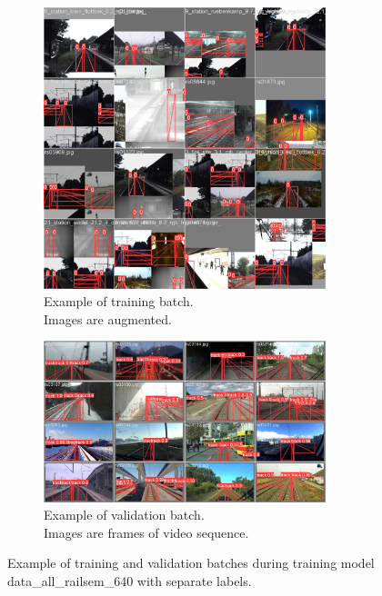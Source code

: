 \documentclass[Master,MDS,english]{BASE/twbook} %
\begin{document}
\begin{figure}[H]
\centering
\begin{subfigure}[t]{.5\textwidth}
  \centering
  \includegraphics[width=0.9\textwidth]{images/yolo/all_nl/train_batch2}
  \caption{Example of training batch.\\ Images are augmented.}
    \label{fig:mosaic_augmentation_highres_all}
\end{subfigure}%
\begin{subfigure}[t]{.5\textwidth}
  \centering
  \includegraphics[width=0.9\textwidth]{images/yolo/all_nl/val_batch2_pred}
  \caption{Example of validation batch.\\ Images are frames of video sequence.}
  \label{fig:mosaic_2}
\end{subfigure}
\caption{Example of training and validation batches during training model data\_all\_railsem\_640 with separate labels.}
\label{fig:yolo_all_example_nl}
\end{figure}
\end{document}
